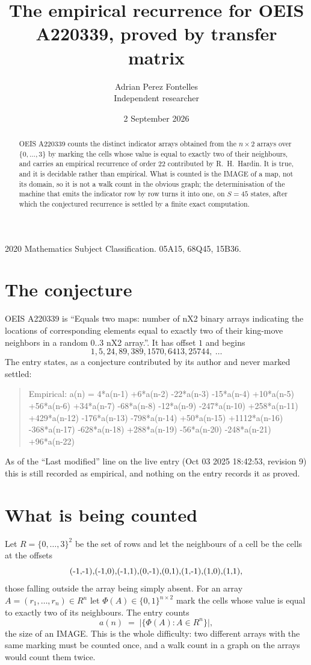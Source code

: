 \documentclass[11pt,a4paper]{article}
\title{The empirical recurrence for OEIS A220339, proved by transfer matrix}
\author{Adrian Perez Fontelles\\ \small Independent researcher}
\date{2 September 2026}
\theoremstyle{plain}
\theoremstyle{definition}
\begin{document}
\maketitle

\begin{abstract}
OEIS A220339 counts the distinct indicator arrays obtained from the $n\times2$ arrays over
$\{0,\dots,3\}$ by marking the cells whose value is equal to exactly two of their neighbours, and carries an
empirical recurrence of order $22$ contributed by R.~H.~Hardin. It is true, and it is
decidable rather than empirical. What is counted is the IMAGE of a map, not its domain, so it
is not a walk count in the obvious graph; the determinisation of the machine that emits the
indicator row by row turns it into one, on $S=45$ states, after which the conjectured
recurrence is settled by a finite exact computation.
\end{abstract}

\noindent\small 2020 Mathematics Subject Classification. 05A15, 68Q45, 15B36.\normalsize

\section{The conjecture}

OEIS A220339 is ``Equals two maps: number of nX2 binary arrays indicating the locations of corresponding elements equal to exactly two of their king-move neighbors in a random 0..3 nX2 array.''. It has offset $1$ and begins
\[
1, 5, 24, 89, 389, 1570, 6413, 25744,\ \dots
\]
The entry states, as a conjecture contributed by its author and never marked settled:
\begin{quote}
Empirical: a(n) = 4*a(n-1) +6*a(n-2) -22*a(n-3) -15*a(n-4) +10*a(n-5) +56*a(n-6) +34*a(n-7) -68*a(n-8) -12*a(n-9) -247*a(n-10) +258*a(n-11) +429*a(n-12) -176*a(n-13) -798*a(n-14) +50*a(n-15) +1112*a(n-16) -368*a(n-17) -628*a(n-18) +288*a(n-19) -56*a(n-20) -248*a(n-21) +96*a(n-22)
\end{quote}
As of the ``Last modified'' line on the live entry (Oct 03 2025 18:42:53, revision 9) this is still
recorded as empirical, and nothing on the entry records it as proved.

\section{What is being counted}

Let $R=\{0,\dots,3\}^{2}$ be the set of rows and let the neighbours of a cell be the
cells at the offsets
\[
$(-1,-1)$, $(-1,0)$, $(-1,1)$, $(0,-1)$, $(0,1)$, $(1,-1)$, $(1,0)$, $(1,1)$,
\]
those falling outside the array being simply absent. For an array
$A=(r_1,\dots,r_n)\in R^n$ let $\Phi(A)\in\{0,1\}^{n\times2}$ mark the cells whose value
is equal to exactly two of its neighbours. The entry counts
\[
a(n)\;=\;\bigl|\{\Phi(A):A\in R^n\}\bigr| ,
\]
the size of an IMAGE. This is the whole difficulty: two different arrays with the same marking
must be counted once, and a walk count in a graph on the arrays would count them twice.
\end{document}
